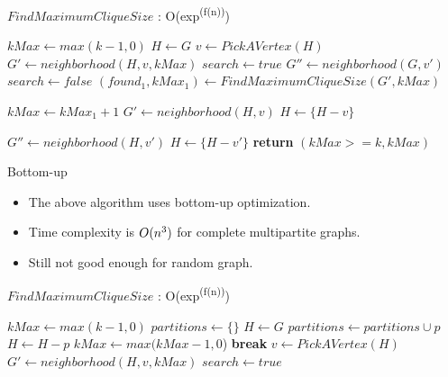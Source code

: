 \documentclass[landscape]{slides}
\begin{document}
\begin{algorithm}
	\caption{$FindMaximumCliqueSize$ : O(exp\textsuperscript{(f(n))})}
	\begin{algorithmic}[1]
		\State $kMax \gets max(k - 1, 0)$
		\State $H \gets G$
		\State $v \gets PickAVertex(H)$
		\State $G' \gets neighborhood(H, v, kMax)$
			{\color{red}
			\State $search \gets true$
				\State $G'' \gets neighborhood(G, v')$
					\State $search \gets false$
				\EndIf
			\EndFor }
				\State $(found_1, kMax_1) \gets FindMaximumCliqueSize(G', kMax)$
	\end{algorithmic}
\end{algorithm}


\begin{algorithm}
	\begin{algorithmic}[1]
					\State $kMax \gets kMax_1 + 1$
				\EndIf
			\EndIf
		\EndIf
		\State $G' \gets neighborhood(H, v)$
		\State $H \gets \{H - v\}$
		
		\State $G'' \gets neighborhood(H, v')$
		\State $H \gets \{H - v'\}$
		\EndIf
		\EndFor
		\EndWhile
		\State \textbf{return} $(kMax >= k, kMax)$
		\EndFunction
	\end{algorithmic}
\end{algorithm}


\clearpage
\begin{slide}
	\begin{center}{\large Bottom-up }\end{center}
	\begin{itemize}
		\setlength{\itemsep}{0pt}
		\setlength{\parskip}{20pt}
		\setlength{\parsep}{0pt}
		\item The above algorithm uses bottom-up optimization.
		\item Time complexity is $O(n\textsuperscript{3})$ for complete multipartite graphs.
		\item Still not good enough for random graph.
	\end{itemize}
\end{slide}


\begin{algorithm}
	\caption{$FindMaximumCliqueSize$ : O(exp\textsuperscript{(f(n))})}
	\begin{algorithmic}[1]
		\State $kMax \gets max(k - 1, 0)$
		\State $partitions \gets \{\}$
		\State $H \gets G$
				\State $partitions \gets partitions \cup p$
				\State $H \gets H - p$
				\State $kMax \gets max(kMax - 1, 0$)
			\EndWhile
				\State \textbf{break}
			\EndIf
			\State $v \gets PickAVertex(H)$
			\State $G' \gets neighborhood(H, v, kMax)$
				\State $search \gets true$
	\end{algorithmic}
\end{algorithm}
\end{document}

